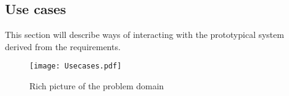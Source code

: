 \subsection{Use cases}\label{sub:usecases}

This section will describe ways of interacting with the prototypical system derived from the requirements.

\begin{figure}
  \centering
  \begin{adjustbox}{max width=\textwidth}
    \texttt{[image: Usecases.pdf]}
  \end{adjustbox}
  \caption{Rich picture of the problem domain}
\end{figure}
